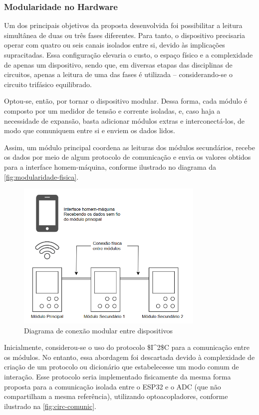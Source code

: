 \subsubsection{Modularidade no Hardware}\label{modularidade-metodologia}

Um dos principais objetivos da proposta desenvolvida foi possibilitar a leitura simultânea de duas ou três fases diferentes. Para tanto, o dispositivo precisaria operar com quatro ou seis canais isolados entre si, devido às implicações supracitadas. Essa configuração elevaria o custo, o espaço físico e a complexidade de apenas um dispositivo, sendo que, em diversas etapas das disciplinas de circuitos, apenas a leitura de uma das fases é utilizada – considerando-se o circuito trifásico equilibrado.

Optou-se, então, por tornar o dispositivo modular. Dessa forma, cada módulo é composto por um medidor de tensão e corrente isoladas, e, caso haja a necessidade de expansão, basta adicionar módulos extras e interconectá-los, de modo que comuniquem entre si e enviem os dados lidos.

Assim, um módulo principal coordena as leituras dos módulos secundários, recebe os dados por meio de algum protocolo de comunicação e envia os valores obtidos para a interface homem-máquina, conforme ilustrado no diagrama da \autoref{fig:modularidade-fisica}.

\begin{figure}[htb!]
    \caption{Diagrama de conexão modular entre dispositivos}
    \label{fig:modularidade-fisica}
    \includegraphics[width=0.8\textwidth]{figuras/mod-fisica.png}
    \fonte{}
\end{figure}

Inicialmente, considerou-se o uso do protocolo \gls{$I^2$C} para a comunicação entre os módulos. No entanto, essa abordagem foi descartada devido à complexidade de criação de um protocolo ou dicionário que estabelecesse um modo comum de interação. Esse protocolo seria implementado fisicamente da mesma forma proposta para a comunicação isolada entre o ESP32 e o \gls{ADC} (que não compartilham a mesma referência), utilizando optoacopladores, conforme ilustrado na \autoref{fig:circ-comunic}.

